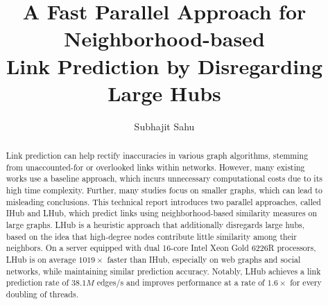 \documentclass[sigconf,nonacm]{acmart}
\begin{document}
\title[A Fast Parallel Approach for Neighborhood-based Link Prediction by Disregarding Large Hubs]{A Fast Parallel Approach for Neighborhood-based \\Link Prediction by Disregarding Large Hubs}


\author{Subhajit Sahu}



\begin{abstract}
Link prediction can help rectify inaccuracies in various graph algorithms, stemming from unaccounted-for or overlooked links within networks. However, many existing works use a baseline approach, which incurs unnecessary computational costs due to its high time complexity. Further, many studies focus on smaller graphs, which can lead to misleading conclusions. This technical report introduces two parallel approaches, called IHub and LHub, which predict links using neighborhood-based similarity measures on large graphs. LHub is a heuristic approach that additionally disregards large hubs, based on the idea that high-degree nodes contribute little similarity among their neighbors. On a server equipped with dual 16-core Intel Xeon Gold 6226R processors, LHub is on average $1019\times$ faster than IHub, especially on web graphs and social networks, while maintaining similar prediction accuracy. Notably, LHub achieves a link prediction rate of $38.1M$ edges/s and improves performance at a rate of $1.6\times$ for every doubling of threads.
\end{abstract}

\end{document}
